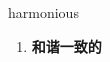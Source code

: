 
\begin{frame}
{\huge harmonious}
\begin{center}
\begin{enumerate}\Large
  \item \textbf{和谐一致的}
\end{enumerate}
\end{center}
\end{frame}
